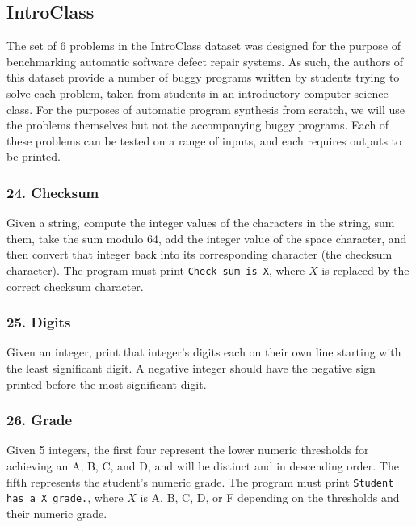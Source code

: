 \documentclass{sig-alternate}
\begin{document}
\subsection{IntroClass}


The set of 6 problems in the IntroClass dataset \cite{ManyBugsAndIntroClass, Brun13TRgptest} was designed for the purpose of benchmarking automatic software defect repair systems. As such, the authors of this dataset provide a number of buggy programs written by students trying to solve each problem, taken from students in an introductory computer science class. For the purposes of automatic program synthesis from scratch, we will use the problems themselves but not the accompanying buggy programs. 
Each of these problems can be tested on a range of inputs, and each requires outputs to be printed.

\subsubsection*{24. Checksum}
Given a string, compute the integer values of the characters in the string, sum them, take the sum modulo 64, add the integer value of the space character, and then convert that integer back into its corresponding character (the checksum character). The program must print \texttt{Check sum is X}, where $X$ is replaced by the correct checksum character.

\subsubsection*{25. Digits}
Given an integer, print that integer's digits each on their own line starting with the least significant digit. A negative integer should have the negative sign printed before the most significant digit.

\subsubsection*{26. Grade}
Given 5 integers, the first four represent the lower numeric thresholds for achieving an A, B, C, and D, and will be distinct and in descending order. The fifth represents the student's numeric grade. The program must print \texttt{Student has a X grade.}, where $X$ is A, B, C, D, or F depending on the thresholds and their numeric grade.
\end{document}
